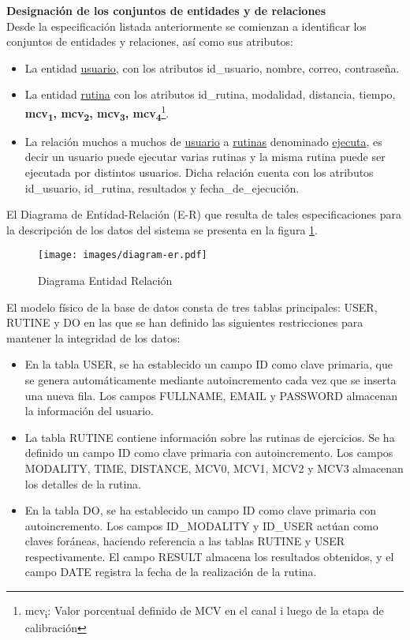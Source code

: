 \vspace{5pt}
\textbf{Designación de los conjuntos de entidades y de relaciones}\\
Desde la especificación listada anteriormente se comienzan a
identificar los conjuntos de entidades y relaciones, así como sus atributos:
\begin{itemize}
    \item La entidad \underline{usuario}, con los atributos id\_usuario, nombre, correo, contraseña.
    \item La entidad \underline{rutina} con los atributos id\_rutina, modalidad, distancia, tiempo, \textbf{mcv\textsubscript{1}, mcv\textsubscript{2}, mcv\textsubscript{3}, mcv\textsubscript{4}}\footnote{mcv\textsubscript{i}: Valor porcentual definido de MCV en el canal i luego de la etapa de calibración}.
    \item La relación muchos a muchos de \underline{usuario} a \underline{rutinas} denominado \underline{ejecuta}, es decir un usuario puede ejecutar 
    varias rutinas y la misma rutina puede ser ejecutada por distintos usuarios. Dicha relación cuenta con los atributos id\_usuario, id\_rutina, resultados y fecha\_de\_ejecución. 
\end{itemize}
    
\vspace{5pt}
El Diagrama de Entidad-Relación (E-R) que resulta de tales especificaciones para la descripción de los datos del sistema se presenta en la figura \ref{fig: diagram-er}.
\begin{figure}[ht]
    \centering
    \texttt{[image: images/diagram-er.pdf]}
    \caption{Diagrama Entidad Relación}
    \label{fig: diagram-er}
\end{figure}

El modelo físico de la base de datos consta de tres tablas principales: USER, RUTINE y DO en las que se han definido las siguientes restricciones para mantener la integridad de los datos:

\begin{itemize}
    \item En la tabla USER, se ha establecido un campo ID como clave primaria, que se genera automáticamente mediante autoincremento 
    cada vez que se inserta una nueva fila. Los campos FULLNAME, EMAIL y PASSWORD almacenan la información del usuario.

    \item La tabla RUTINE contiene información sobre las rutinas de ejercicios. Se ha definido un campo ID como clave primaria con 
    autoincremento. Los campos MODALITY, TIME, DISTANCE, MCV0, MCV1, MCV2 y MCV3 almacenan los detalles de la rutina.

    \item En la tabla DO, se ha establecido un campo ID como clave primaria con autoincremento. Los campos ID\_MODALITY y ID\_USER actúan 
    como claves foráneas, haciendo referencia a las tablas RUTINE y USER respectivamente. El campo RESULT almacena los resultados obtenidos, 
    y el campo DATE registra la fecha de la realización de la rutina.
\end{itemize}

